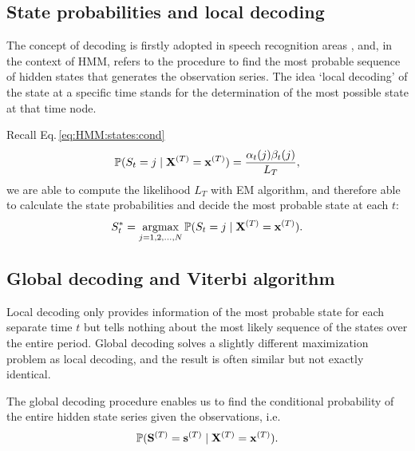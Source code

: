 \subsection{State probabilities and local decoding}
\label{sec:HMM:predeco:locdeco}
The concept of decoding is firstly adopted in speech recognition areas \cite{Fredkin:1992ba},
and, in the context of HMM,
refers to the procedure to find the most probable sequence of hidden states
that generates the observation series.
The idea `local decoding' of the state at a specific time 
stands for the determination of the most possible state at that time node.

Recall Eq.\,\ref{eq:HMM:states:cond}
		\begin{equation*}
		\mathbb{P}(S_t = j \mid {\mathbf X}^{(T)} = {\mathbf x}^{(T)}) = \frac{\alpha_t(j)\beta_t(j)}{L_T},
		\end{equation*}
we are able to compute the likelihood $L_T$ with EM algorithm,
and therefore able to calculate the state probabilities and 
decide the most probable state at each $t$:
		\begin{equation}
		\label{eq:HMM:predeco:locdeco:state}
		S_t^{\ast} = \operatorname*{argmax}_{j = 1,2,\dots,N} \mathbb{P}(S_t = j \mid {\mathbf X}^{(T)} = {\mathbf x}^{(T)}).
		\end{equation}


\subsection{Global decoding and Viterbi algorithm}
\label{sec:HMM:predeco:glodeco}
Local decoding only provides information of the most probable state for each separate time $t$
but tells nothing about the most likely sequence of the states over the entire period.
Global decoding solves a slightly different maximization problem as local decoding,
and the result is often similar but not exactly identical.

The global decoding procedure enables us to find 
the conditional probability of the entire hidden state series given the observations, i.e.
		\begin{equation}
		\label{eq:HMM:predeco:glodeco:prob}
		\mathbb{P}({\mathbf S}^{(T)} = {\mathbf s}^{(T)} \mid {\mathbf X}^{(T)} = {\mathbf x}^{(T)}).
		\end{equation}


